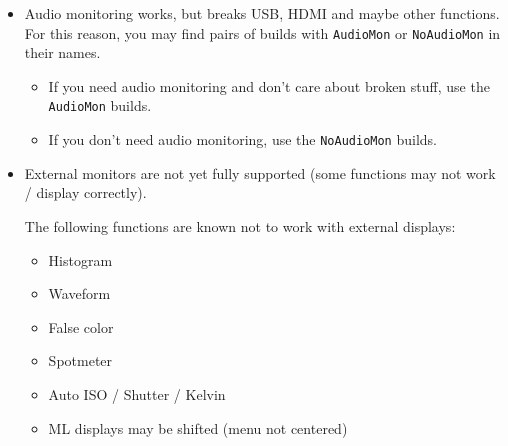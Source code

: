 \documentclass[a4paper,english]{article}
\begin{document}
\begin{itemize}

\item Audio monitoring works, but breaks USB, HDMI and maybe other functions.
For this reason, you may find pairs of builds with \texttt{AudioMon} or \texttt{NoAudioMon} in their names.
%
\begin{itemize}

\item If you need audio monitoring and don't care about broken stuff, use the \texttt{AudioMon} builds.

\item If you don't need audio monitoring, use the \texttt{NoAudioMon} builds.

\end{itemize}

\item External monitors are not yet fully supported (some functions may not work / display correctly).

The following functions are known not to work with external displays:
%
\begin{itemize}

\item Histogram

\item Waveform

\item False color

\item Spotmeter

\item Auto ISO / Shutter / Kelvin

\item ML displays may be shifted (menu not centered)

\end{itemize}

\end{itemize}


\end{document}
